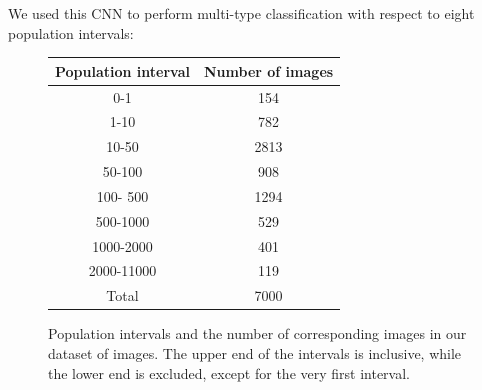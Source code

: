 \documentclass{article}
\begin{document}
We used this CNN to perform multi-type classification with respect to eight population intervals:
\begin{figure}[ht]
\center
\begin{tabular}{ |c|c| } 
\hline
Population interval & Number of images\\
\hline
0-1& 154\\ 
1-10& 782\\ 
10-50& 2813\\
50-100& 908\\
100- 500& 1294\\
500-1000& 529\\
1000-2000& 401\\
2000-11000& 119\\
Total& 7000\\
\hline
\end{tabular}
\caption{Population intervals and the number of corresponding images in our dataset of images. The upper end of the intervals is inclusive, while the lower end is excluded, except for the very first interval.}
\end{figure}
\end{document}
